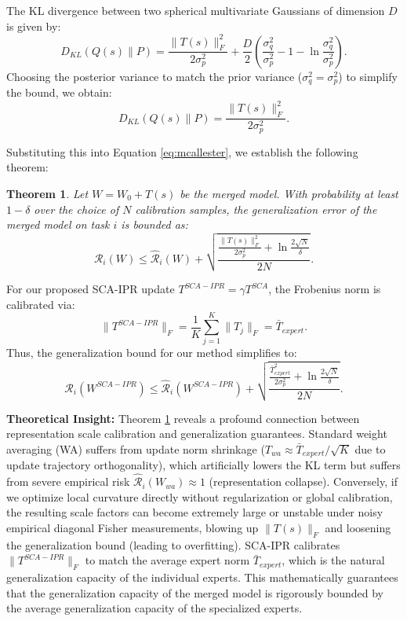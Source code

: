 \documentclass{article}
\theoremstyle{plain}
\newtheorem{theorem}{Theorem}[section]
\theoremstyle{definition}
\theoremstyle{remark}
\begin{document}
The KL divergence between two spherical multivariate Gaussians of dimension $D$ is given by:
\begin{equation}
    D_{KL}(Q(s) \parallel P) = \frac{\|T(s)\|_F^2}{2 \sigma_p^2} + \frac{D}{2} \left( \frac{\sigma_q^2}{\sigma_p^2} - 1 - \ln \frac{\sigma_q^2}{\sigma_p^2} \right).
\end{equation}
Choosing the posterior variance to match the prior variance ($\sigma_q^2 = \sigma_p^2$) to simplify the bound, we obtain:
\begin{equation}
    D_{KL}(Q(s) \parallel P) = \frac{\|T(s)\|_F^2}{2 \sigma_p^2}.
\end{equation}

Substituting this into Equation \ref{eq:mcallester}, we establish the following theorem:
\begin{theorem}
Let $W = W_0 + T(s)$ be the merged model. With probability at least $1 - \delta$ over the choice of $N$ calibration samples, the generalization error of the merged model on task $i$ is bounded as:
\begin{equation}
    \mathcal{R}_i(W) \le \widehat{\mathcal{R}}_i(W) + \sqrt{\frac{\frac{\|T(s)\|_F^2}{2\sigma_p^2} + \ln \frac{2\sqrt{N}}{\delta}}{2N}}.
\end{equation}
\label{thm:pac_bounds}
\end{theorem}

For our proposed SCA-IPR update $T^{SCA-IPR} = \gamma T^{SCA}$, the Frobenius norm is calibrated via:
\begin{equation}
    \|T^{SCA-IPR}\|_F = \frac{1}{K} \sum_{j=1}^K \|T_j\|_F = \bar{T}_{expert}.
\end{equation}
Thus, the generalization bound for our method simplifies to:
\begin{equation}
    \mathcal{R}_i(W^{SCA-IPR}) \le \widehat{\mathcal{R}}_i(W^{SCA-IPR}) + \sqrt{\frac{\frac{\bar{T}_{expert}^2}{2\sigma_p^2} + \ln \frac{2\sqrt{N}}{\delta}}{2N}}.
\end{equation}

\textbf{Theoretical Insight:} 
Theorem \ref{thm:pac_bounds} reveals a profound connection between representation scale calibration and generalization guarantees. 
Standard weight averaging (WA) suffers from update norm shrinkage ($T_{wa} \approx \bar{T}_{expert} / \sqrt{K}$ due to update trajectory orthogonality), which artificially lowers the KL term but suffers from severe empirical risk $\widehat{\mathcal{R}}_i(W_{wa}) \approx 1$ (representation collapse).
Conversely, if we optimize local curvature directly without regularization or global calibration, the resulting scale factors can become extremely large or unstable under noisy empirical diagonal Fisher measurements, blowing up $\|T(s)\|_F$ and loosening the generalization bound (leading to overfitting).
SCA-IPR calibrates $\|T^{SCA-IPR}\|_F$ to match the average expert norm $\bar{T}_{expert}$, which is the natural generalization capacity of the individual experts. This mathematically guarantees that the generalization capacity of the merged model is rigorously bounded by the average generalization capacity of the specialized experts.
\end{document}
